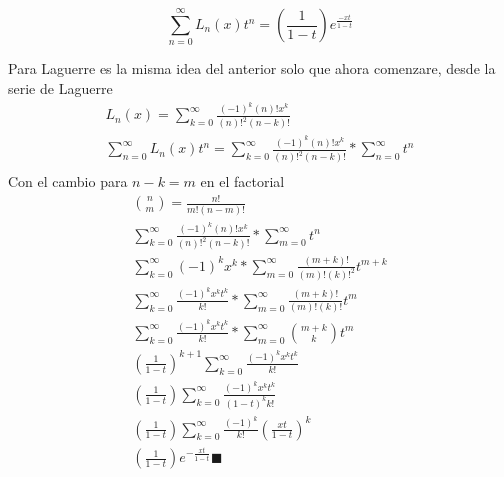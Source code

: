 \begin{prob}
     $$\sum_{n=0}^{\infty}L_{n}(x)t^n=  \left( \frac{1}{1-t} \right)e^{\frac{-xt}{1-t}}$$
\end{prob}
\begin{mdframed}
Para Laguerre es la misma idea del anterior solo que ahora comenzare, desde la serie de Laguerre
\begin{gather*}
    L_{n}(x) =\sum_{k=0}^\infty \frac{(-1)^k(n)!x^k}{(n)!^2(n-k)!}\\
    \sum_{n=0}^{\infty}L_{n}(x)t^n=\sum_{k=0}^\infty \frac{(-1)^k(n)!x^k}{(n)!^2(n-k)!}*\sum_{n=0}^{\infty}t^n\\
\end{gather*}
Con el cambio para $n-k=m$ en el factorial
\begin{gather*}
    \binom{n}{m} = \frac{n!}{m!(n-m)!}\\
    \sum_{k=0}^\infty \frac{(-1)^k(n)!x^k}{(n)!^2(n-k)!}*\sum_{m=0}^{\infty}t^n\\
    \sum_{k=0}^\infty (-1)^k x^k*\sum_{m=0}^{\infty}\frac{(m+k)!}{(m)!(k)!^2}t^{m+k}\\
    \sum_{k=0}^\infty \frac{(-1)^k x^k t^k}{k!}*\sum_{m=0}^{\infty}\frac{(m+k)!}{(m)!(k)!}t^{m}\\
    \sum_{k=0}^\infty \frac{(-1)^k x^k t^k}{k!}*\sum_{m=0}^{\infty} \binom{m+k}{k}t^{m}\\
    (\frac{1}{1-t})^{k+1}\sum_{k=0}^\infty \frac{(-1)^k x^k t^k}{k!}\\
    (\frac{1}{1-t})\sum_{k=0}^\infty \frac{(-1)^k x^k t^k}{(1-t)^k k!}\\
    (\frac{1}{1-t})\sum_{k=0}^\infty \frac{(-1)^k}{k!}(\frac{xt}{1-t})^{k}\\
    (\frac{1}{1-t})e^{-\frac{xt}{1-t}} \blacksquare\\
\end{gather*}

\end{mdframed}
